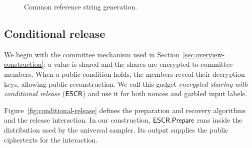 \begin{figure}[tbp]
\centering
{}
\caption{Common reference string generation.}
\label{fig:construction-crs}
\end{figure}

\subsection{Conditional release}
\label{sec:conditional-release}

We begin with the committee mechanism used in
Section~\ref{sec:overview-construction}: a value is shared and the shares are
encrypted to committee members.  When a public condition holds, the
members reveal their decryption keys, allowing public reconstruction.
We call this gadget \emph{encrypted sharing with conditional release}
($\mathsf{ESCR}$) and use it for both nonces and garbled input labels.

Figure~\ref{fig:conditional-release} defines the preparation and recovery
algorithms and the release interaction.  In our construction,
$\mathsf{ESCR}.\mathsf{Prepare}$ runs inside the distribution used by the universal
sampler.  Its output supplies the public ciphertexts for the interaction.

